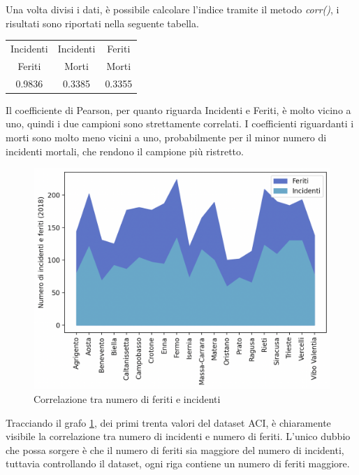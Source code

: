 \documentclass[a4paper]{report}
\begin{document}
Una volta divisi i dati, è possibile calcolare l'indice tramite il metodo \textit{corr()}, i risultati 
sono riportati nella seguente tabella.

\begin{center}
    \def\arraystretch{1.5}%
    \begin{tabular}{ |c|c|c| } 
    \hline
    Incidenti & Incidenti & Feriti \\ 
    Feriti & Morti & Morti \\ 
    \hline
    0.9836 & 0.3385 & 0.3355 \\ 
    \hline
    \end{tabular}
\end{center}

Il coefficiente di Pearson, per quanto riguarda Incidenti e Feriti, 
è molto vicino a uno, quindi i due campioni sono strettamente correlati.
I coefficienti riguardanti i morti sono molto meno vicini a uno, probabilmente per il minor numero 
di incidenti mortali, che rendono il campione più ristretto.

\begin{figure}
    \includegraphics[width=\linewidth]{../src/incidenti/incidenti_aci/provincia/corr_incidenti_feriti.png}
    \caption{Correlazione tra numero di feriti e incidenti}
    \label{fig:corr-incidenti-feriti}
\end{figure}

Tracciando il grafo \ref{fig:corr-incidenti-feriti}, dei primi trenta valori del dataset ACI, 
è chiaramente visibile la correlazione tra numero di incidenti e numero di feriti.
L'unico dubbio che possa sorgere è che il numero di feriti sia maggiore del numero di incidenti, 
tuttavia controllando il dataset, ogni riga contiene un numero di feriti maggiore. 
\end{document}
